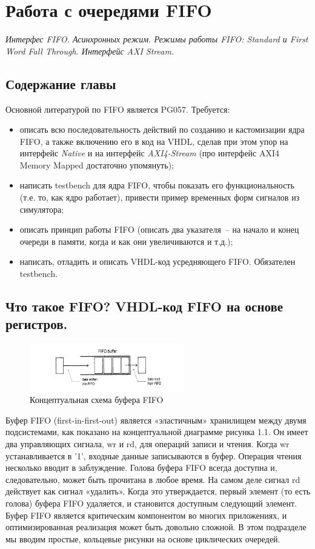 \chapter{Работа с очередями FIFO}

\emph{Интерфес FIFO. Асинхронных режим. Режимы работы FIFO: Standard и First Word Fall Through. Интерфейс AXI Stream.}

\section{Содержание главы}

Основной литературой по FIFO является PG057. Требуется:
\begin{itemize}
\item описать всю последовательность действий по созданию и кастомизации ядра FIFO, а также включению его в код на VHDL, сделав при этом упор на интерфейс \emph{Native} и на интерфейс \emph{AXI4-Stream} (про интерфейс AXI4 Memory Mapped достаточно упомянуть);
\item написать testbench для ядра FIFO, чтобы показать его функциональность (т.е. то, как ядро работает), привести пример временных форм сигналов из симулятора;
\item описать принцип работы FIFO (описать два указателя~-- на начало и конец очереди в памяти, когда и как они увеличиваются и т.д.);
\item написать, отладить и описать VHDL-код усредняющего FIFO. Обязателен testbench.
\end{itemize}

\section{Что такое FIFO? VHDL-код FIFO на основе \\  регистров.}

\begin{figure}[h]
\centering
\includegraphics[width=0.6\textwidth]{fifo_bufer}
\caption{Концептуальная схема буфера FIFO}
\label{fifo_bufer_label}
\end{figure}

Буфер FIFO (first-in-first-out) является «эластичным» хранилищем между двумя подсистемами, как показано на концептуальной диаграмме рисунка 1.1.  Он имеет два управляющих сигнала, wr и rd, для операций записи и чтения. Когда wr устанавливается в '1', входные данные записываются в буфер. Операция чтения несколько вводит в заблуждение. Голова буфера FIFO всегда доступна и, следовательно, может быть прочитана в любое время. На самом деле сигнал rd действует как сигнал «удалить». Когда это утверждается, первый элемент (то есть голова) буфера FIFO удаляется, и становится доступным следующий элемент. Буфер FIFO является критическим компонентом во многих приложениях, и оптимизированная реализация может быть довольно сложной. В этом подразделе мы вводим простые,  кольцевые рисунки на основе циклических очередей.

